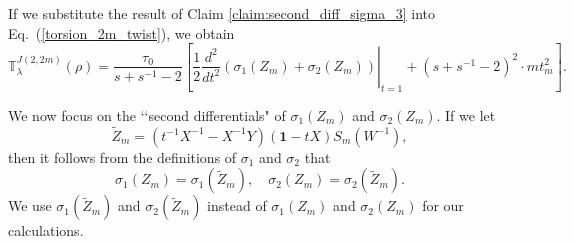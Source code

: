 \documentclass[a4paper]{amsart}
\theoremstyle{plain}
\theoremstyle{definition}
\theoremstyle{remark}
\newcommand{\I}{\mathbf{1}}
\begin{document}
If we substitute the result of Claim \ref{claim:second_diff_sigma_3} into Eq.~(\ref{torsion_2m_twist}), 
we obtain
%
%
\begin{equation}\label{sec_dif}
{\mathbb T}^{J(2, 2m)}_{\lambda}(\rho) = \frac{\tau_0}{s+s^{-1}-2}
\left[
    \left.
    \frac{1}{2} 
    \frac{d^2}{dt^2}
        \left( 
            \sigma_1(Z_m) + \sigma_2(Z_m)
        \right)
    \right|_{t=1}
+ (s+s^{-1} - 2)^2 \cdot mt_m^2
\right]. 
\end{equation}
%

\medskip


We now focus on 
the \lq\lq second differentials" of  $\sigma_1(Z_m)$ and $\sigma_2(Z_m)$.
If we let 
$$\tilde Z_m = (t^{-1}X^{-1}-X^{-1}Y)(\I-tX)S_m(W^{-1}),$$
 then it follows from the definitions of $\sigma_1$ and $\sigma_2$ that 
\[
\sigma_1(Z_m) = \sigma_1(\tilde Z_m), \quad \sigma_2(Z_m) = \sigma_2(\tilde Z_m).
\]
We use $\sigma_1(\tilde Z_m)$ and $\sigma_2(\tilde Z_m)$ instead of 
$\sigma_1(Z_m)$ and $\sigma_2(Z_m)$ for our calculations.
\end{document}
